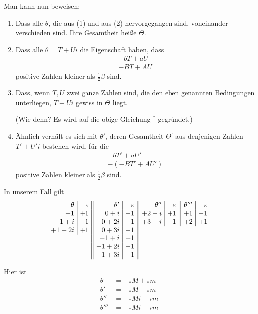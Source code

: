 Man kann nun beweisen:
\begin{enumerate}\renewcommand{\labelenumi}{\arabic{enumi})}
\item Dass alle $\theta$, die aus (1) und aus (2) hervorgegangen sind, voneinander verschieden sind. Ihre Gesamtheit heiße $\Theta$.
\item Dass alle $\theta=T+Ui$ die Eigenschaft haben, dass
\[
\begin{gathered}
-bT+aU\\
-BT+AU
\end{gathered}
\]
positive Zahlen kleiner als $\frac12\beta$ sind.
\item Dass, wenn $T,U$ zwei ganze Zahlen sind, die den eben genannten Bedingungen unterliegen, $T+Ui$ gewiss in $\Theta$ liegt.\par
(Wie denn? Es wird auf die obige Gleichung $^*$ gegründet.)
\item Ähnlich verhält es sich mit $\theta'$, deren Gesamtheit $\Theta'$ aus denjenigen Zahlen $T'+U'i$ bestehen wird, für die
\[
\begin{gathered}
-bT'+aU'\\
-(-BT'+AU')
\end{gathered}
\]
positive Zahlen kleiner als $\frac12\beta$ sind.
\end{enumerate}

In unserem Fall gilt
\[
\setlength{\arraycolsep}{4pt}
\begin{array}{r|r||r|r||r|r||r|r}
\theta&\varepsilon&\theta'&\varepsilon&\theta''&\varepsilon&\theta'''&\varepsilon\\
+1&+1&0+i&-1&+2-i&+1&+1&-1\\
+1+i&-1&0+2i&+1&+3-i&-1&+2&+1\\
+1+2i&+1&0+3i&-1&\multicolumn{4}{c}{}\\
\multicolumn{2}{c||}{}&-1+i&+1&\multicolumn{4}{c}{}\\
\multicolumn{2}{c||}{}&-1+2i&-1&\multicolumn{4}{c}{}\\
\multicolumn{2}{c||}{}&-1+3i&+1&\multicolumn{4}{c}{}
\end{array}
\]

Hier ist
\[
\begin{aligned}
\theta&=-{}_*M+{}_*m\\
\theta'&=-{}_*M-{}_*m\\
\theta''&=+{}_*Mi+{}_*m\\
\theta'''&=+{}_*Mi-{}_*m
\end{aligned}
\]

